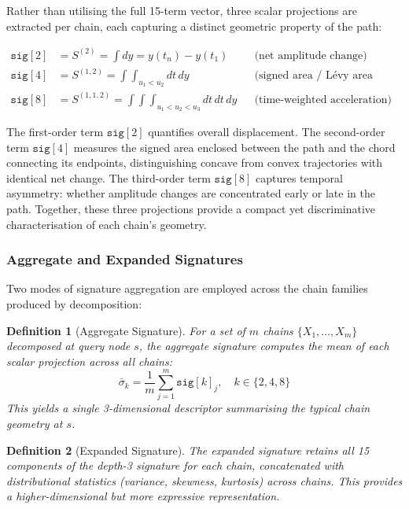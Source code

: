 \documentclass[a4paper,12pt]{article}
\newtheorem{definition}{Definition}
\begin{document}
Rather than utilising the full 15-term vector, three scalar projections are extracted per chain, each capturing a distinct geometric property of the path:

\begin{equation}
\begin{aligned}
\texttt{sig}[2] &= S^{(2)} = \int dy = y(t_n) - y(t_1) && \text{(net amplitude change)} \\[4pt]
\texttt{sig}[4] &= S^{(1,2)} = \int\!\!\int_{u_1 < u_2} dt\, dy && \text{(signed area / L\'{e}vy area analogue)} \\[4pt]
\texttt{sig}[8] &= S^{(1,1,2)} = \int\!\!\int\!\!\int_{u_1 < u_2 < u_3} dt\, dt\, dy && \text{(time-weighted acceleration)}
\end{aligned}
\label{eq:sig-projections}
\end{equation}

The first-order term $\texttt{sig}[2]$ quantifies overall displacement. The second-order term $\texttt{sig}[4]$ measures the signed area enclosed between the path and the chord connecting its endpoints, distinguishing concave from convex trajectories with identical net change. The third-order term $\texttt{sig}[8]$ captures temporal asymmetry: whether amplitude changes are concentrated early or late in the path. Together, these three projections provide a compact yet discriminative characterisation of each chain's geometry.

\subsubsection{Aggregate and Expanded Signatures}

Two modes of signature aggregation are employed across the chain families produced by decomposition:

\begin{definition}[Aggregate Signature]
\label{def:agg-sig}
For a set of $m$ chains $\{X_1, \ldots, X_m\}$ decomposed at query node $s$, the \emph{aggregate signature} computes the mean of each scalar projection across all chains:
\begin{equation}
\bar{\sigma}_k = \frac{1}{m} \sum_{j=1}^{m} \texttt{sig}[k]_j, \quad k \in \{2, 4, 8\}
\end{equation}
This yields a single 3-dimensional descriptor summarising the typical chain geometry at $s$.
\end{definition}

\begin{definition}[Expanded Signature]
\label{def:exp-sig}
The \emph{expanded signature} retains all 15 components of the depth-3 signature for each chain, concatenated with distributional statistics (variance, skewness, kurtosis) across chains. This provides a higher-dimensional but more expressive representation.
\end{definition}
\end{document}
